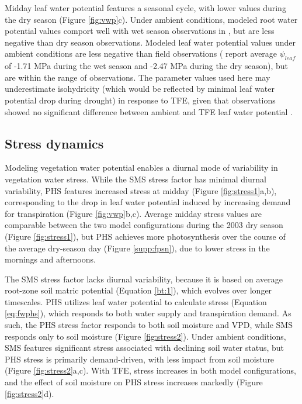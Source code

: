 \documentclass[draft,linenumbers]{agujournal}
\begin{document}
    Midday leaf water potential features a seasonal cycle, with lower values during the dry season (Figure \ref{fig:vwp}c).
    Under ambient conditions, modeled root water potential values comport well with wet season observations in \cite{fisher2006}, but are less negative than dry season observations.
    Modeled leaf water potential values under ambient conditions are less negative than field observations (\cite{fisher2006} report average $\psi_{leaf}$ of -1.71 MPa during the wet season and -2.47 MPa during the dry season), 
    but are within the range of observations.
    The parameter values used here may underestimate isohydricity (which would be reflected by minimal leaf water potential drop during drought) in response to TFE, given that observations showed no significant difference between ambient and TFE leaf water potential \citep{fisher2006}. 

\subsection{Stress dynamics}
    
    Modeling vegetation water potential enables a diurnal mode of variability in vegetation water stress.
    While the SMS stress factor has minimal diurnal variability,
    PHS features increased stress at midday (Figure \ref{fig:stress1}a,b), corresponding to the drop in leaf water potential induced by increasing demand for transpiration (Figure \ref{fig:vwp}b,c).
    Average midday stress values are comparable between the two model configurations during the 2003 dry season (Figure \ref{fig:stress1}), 
    but PHS achieves more photosynthesis over the course of the average dry-season day (Figure \ref{supp:fpsn}), due to lower stress in the mornings and afternoons.
    
    The SMS stress factor lacks diurnal variability, because it is based on average root-zone soil matric potential (Equation \ref{bt:1}), which evolves over longer timescales.
    PHS utilizes leaf water potential to calculate stress (Equation \ref{eq:fwphs}), which responds to both water supply and transpiration demand.
    As such, the PHS stress factor responds to both soil moisture and VPD, while SMS responds only to soil moisture (Figure \ref{fig:stress2}).
    Under ambient conditions, SMS features significant stress associated with declining soil water status, but PHS stress is primarily demand-driven, with less impact from soil moisture (Figure \ref{fig:stress2}a,c).
    With TFE, stress increases in both model configurations, and the effect of soil moisture on PHS stress increases markedly (Figure \ref{fig:stress2}d).
\end{document}
